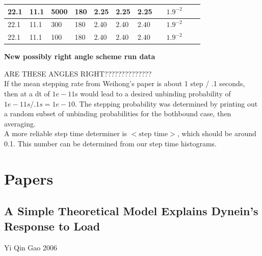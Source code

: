 \documentclass[10pt]{article} %
\begin{document}
\begin{center}
\begin{tabular}{| l | l | l | l | l | l | l | p{3cm} | p{2cm} | l | p{5cm} |}
    22.1 & 11.1 & 5000 &  180 & 2.25 & 2.25 & 2.25 & & $1.9^{-2}$ & & \\\hline
    22.1 & 11.1 & 300 &  180 & 2.40 & 2.40 & 2.40 & & $1.9^{-2}$ & & \\\hline
    22.1 & 11.1 & 100 &  180 & 2.40 & 2.40 & 2.40 & & $1.9^{-2}$ & & \\\hline
  \end{tabular}
  \textbf{New possibly right angle scheme run data}
\end{center}

ARE THESE ANGLES RIGHT??????????????\\

If the mean stepping rate from Weihong's paper is about 1 step / .1 seconds, then at a dt of $1e-11$s would lead to a desired unbinding
probability of $1e-11s/.1s = 1e-10$. The stepping probability was determined by printing out a random subset of unbinding probabilities
for the bothbound case, then averaging.\\

A more reliable step time determiner is $\Big<\mbox{step time}\Big>$, which should be around 0.1. This number can be determined from our step time histograms.\\

\section{Papers}

\subsection{A Simple Theoretical Model Explains Dynein’s Response to Load}
Yi Qin Gao 2006
\end{document}
